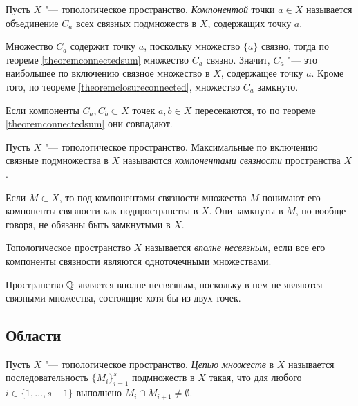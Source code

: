 \begin{definition}
	Пусть $X$ "--- топологическое пространство. \textit{Компонентой} точки $a \in X$ называется объединение $C_a$ всех связных подмножеств в $X$, содержащих точку $a$.
\end{definition}

\begin{note}
	Множество $C_a$ содержит точку $a$, поскольку множество $\{a\}$ связно, тогда по теореме \ref{theoremconnectedsum} множество $C_a$ связно. Значит, $C_a$ "--- это наибольшее по включению связное множество в $X$, содержащее точку $a$. Кроме того, по теореме \ref{theoremclosureconnected}, множество $C_a$ замкнуто.
\end{note}

\begin{note}
	Если компоненты $C_a, C_b \subset X$ точек $a, b \in X$ пересекаются, то по теореме \ref{theoremconnectedsum} они совпадают.
\end{note}

\begin{definition}
	Пусть $X$ "--- топологическое пространство. Максимальные по включению связные подмножества в $X$ называются \textit{компонентами связности} пространства $X$.
\end{definition}

\begin{note}
	Если $M\subset X$, то под компонентами связности множества $M$ понимают его компоненты связности как подпространства в $X$. Они замкнуты в $M$, но вообще говоря, не обязаны быть замкнутыми в $X$.
\end{note}

\begin{definition}
	Топологическое пространство $X$ называется \textit{вполне несвязным}, если все его компоненты связности являются одноточечными множествами.
\end{definition}

\begin{example}
	Пространство $\mathbb{Q}$ является вполне несвязным, поскольку в нем не являются связными множества, состоящие хотя бы из двух точек.
\end{example}

\subsection{Области}

\begin{note}
	Пусть $X$ "--- топологическое пространство. \textit{Цепью множеств} в $X$ называется последовательность $\{M_i\}_{i = 1}^s$ подмножеств в $X$ такая, что для любого $i \in \{1, \dotsc, s - 1\}$ выполнено $M_i \cap M_{i+1} \ne \emptyset$.
\end{note}

